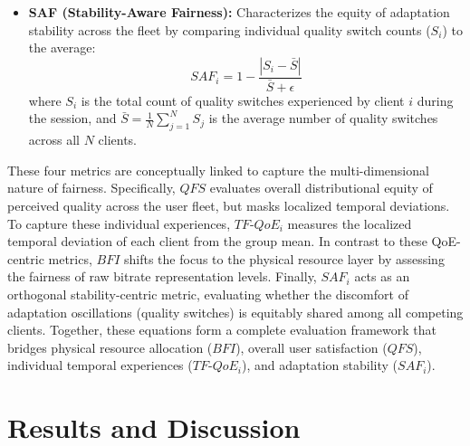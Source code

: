 \documentclass[conference,a4paper]{IEEEtran}
\newcommand{\rvi}[1]{{\color{black}{#1}}} %
\let\vi\rvi %
\begin{document}
{\begin{itemize}[leftmargin=*, noitemsep, topsep=2pt, parsep=0pt]
            \item \textbf{SAF (Stability-Aware Fairness):} Characterizes the equity of adaptation stability across the fleet by comparing individual quality switch counts ($S_i$) to the average:
            \vspace{-0.1cm}
            \begin{equation}
                SAF_i = 1 - \frac{|S_i - \bar{S}|}{\bar{S} + \epsilon}
                \label{eq:saf}
            \end{equation}
            \vspace{-0.1cm}
            where $S_i$ is the total count of quality switches experienced by client $i$ during the session, and $\bar{S} = \frac{1}{N}\sum_{j=1}^{N} S_j$ is the average number of quality switches across all $N$ clients.
        \end{itemize}

        These four metrics are conceptually linked to capture the multi-dimensional nature of fairness. Specifically, $QFS$ evaluates overall distributional equity of perceived quality across the user fleet, but masks localized temporal deviations. To capture these individual experiences, $TF\text{-}QoE_i$ measures the localized temporal deviation of each client from the group mean. In contrast to these QoE-centric metrics, $BFI$ shifts the focus to the physical resource layer by assessing the fairness of raw bitrate representation levels. Finally, $SAF_i$ acts as an orthogonal stability-centric metric, evaluating whether the discomfort of adaptation oscillations (quality switches) is equitably shared among all competing clients. Together, these equations form a complete evaluation framework that bridges physical resource allocation ($BFI$), overall user satisfaction ($QFS$), individual temporal experiences ($TF\text{-}QoE_i$), and adaptation stability ($SAF_i$).}

    
\section{Results and Discussion}
\label{sec:results_discussion}
        \vi{This section presents the experimental findings and discusses the multi-metric fairness trade-offs under variable network conditions.}
\end{document}
